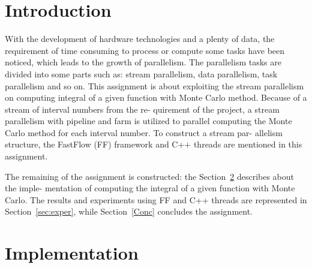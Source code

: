 \documentclass[runningheads,a4paper]{llncs}
\begin{document}
\mainmatter  


\newpage
\tableofcontents
\newpage


\section{Introduction}
\label{sec:intro}


With the development of hardware technologies and a plenty of data, the requirement of time
consuming to process or compute some tasks have been noticed, which leads to the growth
of parallelism. The parallelism tasks are divided into some parts such as: stream parallelism,
data parallelism, task parallelism and so on.
This assignment is about exploiting the stream parallelism on computing integral of a given
function with Monte Carlo method. Because of a stream of interval numbers from the re-
quirement of the project, a stream parallelism with pipeline and farm is utilized to parallel
computing the Monte Carlo method for each interval number. To construct a stream par-
allelism structure, the FastFlow (FF) framework and C++ threads are mentioned in this
assignment.


The remaining of the assignment is constructed: the Section~\ref{sec:imple} describes about the imple-
mentation of computing the integral of a given function with Monte Carlo. The results and
experiments using FF and C++ threads are represented in Section~\ref{sec:exper}, while Section~\ref{Conc} concludes
the assignment.


	
\section{Implementation}
\label{sec:imple}
\end{document}
